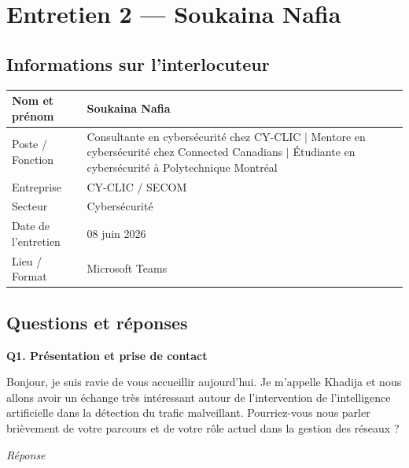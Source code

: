 \documentclass[12pt,a4paper]{article}
\begin{document}
\clearpage

\section{Entretien 2 --- Soukaina Nafia}

\subsection*{Informations sur l'interlocuteur}

\begin{tabular}{@{}B{4cm} L{10.5cm}@{}}
  \hline
  Nom et pr\'{e}nom      & Soukaina Nafia \\
  \hline
  Poste / Fonction   & Consultante en cybers\'{e}curit\'{e} chez CY-CLIC $|$ Mentore en
                       cybers\'{e}curit\'{e} chez Connected Canadians $|$ \'{E}tudiante en
                       cybers\'{e}curit\'{e} \`{a} Polytechnique Montr\'{e}al \\
  \hline
  Entreprise         & CY-CLIC / SECOM \\
  \hline
  Secteur            & Cybers\'{e}curit\'{e} \\
  \hline
  Date de l'entretien & 08 juin 2026 \\
  \hline
  Lieu / Format      & Microsoft Teams \\
  \hline
\end{tabular}

\subsection*{Questions et r\'{e}ponses}

\textbf{Q1. Pr\'{e}sentation et prise de contact}

Bonjour, je suis ravie de vous accueillir aujourd'hui. Je m'appelle Khadija et nous allons avoir
un \'{e}change tr\`{e}s int\'{e}ressant autour de l'intervention de l'intelligence artificielle dans la
d\'{e}tection du trafic malveillant. Pourriez-vous nous parler bri\`{e}vement de votre parcours et de
votre r\^{o}le actuel dans la gestion des r\'{e}seaux ?

\medskip
\textit{R\'{e}ponse}
\end{document}
